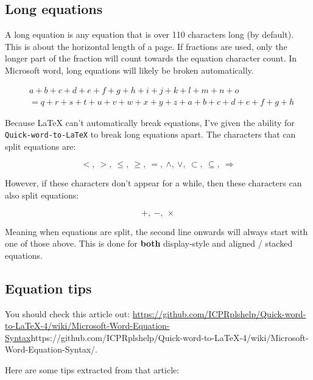 \documentclass[12pt]{article}
\providecommand{\href}[1]{\url{#1}}
\theoremstyle{plain}
\theoremstyle{remark}
\theoremstyle{definition}
\begin{document}
\subsection{Long equations}

A long equation is any equation that is over 110 characters long (by
default). This is about the horizontal length of a page. If fractions
are used, only the longer part of the fraction will count towards the
equation character count. In Microsoft word, long equations will likely
be broken automatically.

\begin{align*}
&a + b + c + d + e + f + g + h + i + j + k + l + m + n + o  \\
&= q + r + s + t + u + v + w + x + y + z + a + b + c + d + e + f + g + h
\end{align*}


Because LaTeX can't automatically break equations, I've given the
ability for \texttt{Quick-word-to-LaTeX} to break long equations apart.
The characters that can split equations are:

\[< ,\  > ,\  \leq ,\  \geq ,\  = ,\  \land ,\  \vee ,\  \subset ,\  \subseteq ,\  \Rightarrow\]

However, if these characters don't appear for a while, then these
characters can also split equations:

\[+ ,\  - ,\  \times\]

Meaning when equations are split, the second line onwards will always
start with one of those above. This is done for \textbf{both}
display-style and aligned / stacked equations.


\subsection{Equation tips}

You should check this article out:
\href{https://github.com/ICPRplshelp/Quick-word-to-LaTeX-4/wiki/Microsoft-Word-Equation-Syntax}{https://github.com/ICPRplshelp/Quick-word-to-LaTeX-4/wiki/Microsoft-Word-Equation-Syntax/}.

Here are some tips extracted from that article:
\end{document}
